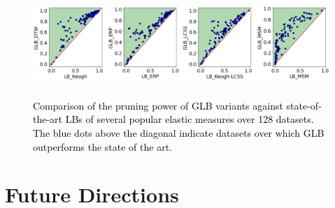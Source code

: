 \documentclass[11pt]{article}
\begin{document}
\begin{figure}[t]
	\vspace*{-0.2cm}
	\centering
	\includegraphics[height=4cm,width=15cm]{submissions/John2023/figures/selected_pruning.png}
	\vspace*{-0.3cm}
	\caption{\textcolor{black}{Comparison of the pruning power of GLB variants against state-of-the-art LBs of several popular elastic measures over 128 datasets. The blue dots above the diagonal indicate datasets over which GLB outperforms the state of the art.}}%
	\label{john_fig:pruning}%
	\vspace*{-0.3cm}
\end{figure}




\section{Future Directions}
\label{john_sec:futurework}
\end{document}
